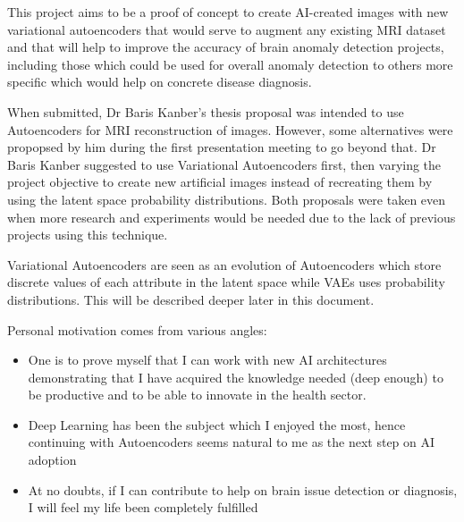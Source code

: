 This project aims to be a proof of concept to create AI-created images with new variational autoencoders that would serve to augment any existing MRI dataset and that will help to improve the accuracy of brain anomaly detection projects, including those which could be used for overall anomaly detection to others more specific which would help on concrete disease diagnosis.

When submitted, Dr Baris Kanber's thesis proposal was intended to use Autoencoders for MRI reconstruction of images. However, some alternatives were propopsed by him during the first presentation meeting to go beyond that. Dr Baris Kanber suggested to use Variational Autoencoders first, then varying the project objective to create new artificial images instead of recreating them by using the latent space probability distributions. Both proposals were taken even when more research and experiments would be needed due to the lack of previous projects using this technique.

Variational Autoencoders are seen as an evolution of Autoencoders which store discrete values of each attribute in the latent space while VAEs uses probability distributions. This will be described deeper later in this document. 

Personal motivation comes from various angles:

\begin{itemize}
    \item One is to prove myself that I can work with new AI architectures demonstrating that I have acquired the knowledge needed (deep enough) to be productive and to be able to innovate in the health sector.
    \item Deep Learning has been the subject which I enjoyed the most, hence continuing with Autoencoders seems natural to me as the next step on AI adoption
    \item At no doubts, if I can contribute to help on brain issue detection or diagnosis, I will feel my life been completely fulfilled
\end{itemize}
